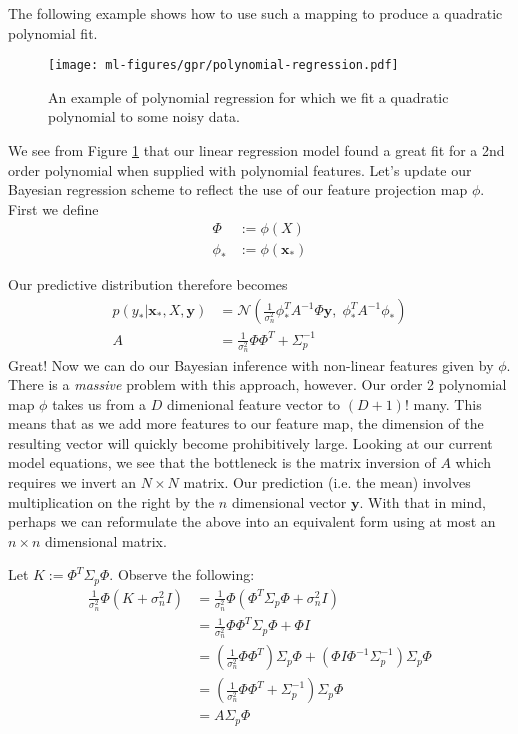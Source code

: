 The following example shows how to use such a mapping to produce a quadratic polynomial fit.

\begin{figure}[h]
  \begin{centering}
    \texttt{[image: ml-figures/gpr/polynomial-regression.pdf]}
  \end{centering}
  \caption{An example of polynomial regression for which we fit a quadratic polynomial to some noisy data.}
  \label{fig:polynomial-regression}
\end{figure}
We see from Figure \ref{fig:polynomial-regression} that our linear regression model found a great fit for a 2nd order polynomial when supplied with polynomial features. Let's update our Bayesian regression scheme to reflect the use of our feature projection map $\phi$. First we define
\begin{align}
  \Phi &:= \phi(X) \\
  \phi_* &:= \phi(\mathbf{x}_*)
\end{align}

Our predictive distribution therefore becomes
\begin{align}
  p(y_* \vert \mathbf{x}_*, X, \mathbf{y}) &= \mathcal{N}\left(\frac{1}{\sigma_n^2}\phi_*^TA^{-1}\Phi\mathbf{y}, \;\phi_*^TA^{-1}\phi_*\right) \\
  A &= \frac{1}{\sigma_n^2}\Phi\Phi^T + \Sigma_p^{-1}
\end{align}
Great! Now we can do our Bayesian inference with non-linear features given by $\phi$. There is a \textit{massive} problem with this approach, however. Our order 2 polynomial map $\phi$ takes us from a $D$ dimenional feature vector to $(D+1)!$ many. This means that as we add more features to our feature map, the dimension of the resulting vector will quickly become prohibitively large. Looking at our current model equations, we see that the bottleneck is the matrix inversion of $A$ which requires we invert an $N\times N$ matrix. Our prediction (i.e. the mean) involves multiplication on the right by the $n$ dimensional vector $\mathbf{y}$. With that in mind, perhaps we can reformulate the above into an equivalent form using at most an $n\times n$ dimensional matrix.

Let $K:= \Phi^T\Sigma_p\Phi$. Observe the following:
\begin{align}
  \frac{1}{\sigma_n^2}\Phi(K+\sigma_n^2I) &= \frac{1}{\sigma_n^2}\Phi\left(\Phi^T\Sigma_p\Phi + \sigma_n^2I \right) \\
  &= \frac{1}{\sigma_n^2}\Phi\Phi^T\Sigma_p\Phi + \Phi I \\
  &= \left(\frac{1}{\sigma_n^2}\Phi\Phi^T \right)\Sigma_p\Phi + \left(\Phi I \Phi^{-1}\Sigma_p^{-1} \right)\Sigma_p\Phi \\
  &= \left(\frac{1}{\sigma_n^2}\Phi\Phi^T + \Sigma_p^{-1}\right)\Sigma_p\Phi \\
  &= A\Sigma_p\Phi
\end{align}

